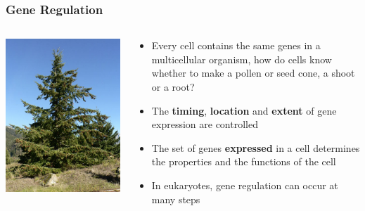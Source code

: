 \documentclass{beamer}
\begin{document}
\begin{frame}
	\frametitle{Gene Regulation}

	\begin{columns}
		\begin{column}{0.5\textwidth}
		\centering	\includegraphics[keepaspectratio, width  = \textwidth]{img/doug-fir}\\ 
	\end{column}
		\begin{column}{0.5\textwidth}
			\begin{itemize}
				\scriptsize

			\item[] Every cell contains the same genes in a multicellular organism,  how do cells know whether to make a pollen or seed cone, a shoot or a root? \pause
			\item[] The \textbf{timing}, \textbf{location} and \textbf{extent} of gene expression are controlled  \pause
			\item[] The set of genes \textbf{expressed} in a cell determines the properties and the functions of the cell \pause
			\item[] In eukaryotes, gene regulation can occur at many steps 
			\end{itemize}
			\end{column}
	
			\end{columns}
	
\end{frame}
\end{document}
